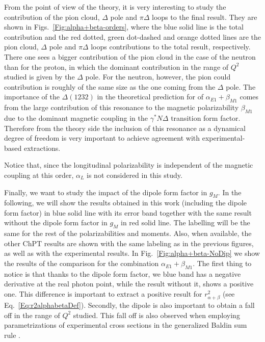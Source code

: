 \documentclass[prc,twocolumn,showpacs,preprintnumbers,amsmath,amssymb
,superscriptaddress,a4paper,nofootinbib
]{revtex4-1}
\begin{document}
From the point of view of the theory, it is very interesting to study the contribution of the pion cloud, $\Delta$ pole and $\pi \Delta$ loops to the final result. 
They are shown in Figs.~\ref{Fig:alpha+beta-orders}, where the blue solid line is the total contribution and the red dotted, green dot-dashed and orange dotted lines are the pion cloud, $\Delta$ pole and $\pi \Delta$ loops contributions to the total result, respectively.
There one sees a bigger contribution of the pion cloud in the case of the neutron than for the proton, in which the dominant contribution in the range of $Q^2$ studied is given by the $\Delta$ pole. 
For the neutron, however, the pion could contribution is roughly of the same size as the one coming from the $\Delta$ pole.
The importance of the $\Delta(1232)$ in the theoretical prediction for of $\alpha_{E1}+\beta_{M1}$ comes from the large contribution of this resonance to the magnetic polarizability $\beta_{M1}$ due to the dominant magnetic coupling in the $\gamma^* N \Delta$ transition form factor. 
Therefore from the theory side the inclusion of this resonance as a dynamical degree of freedom is very important to achieve agreement with experimental-based extractions.




  Notice that, since the longitudinal polarizability is independent of the magnetic coupling at this order, $\alpha_L$ is not considered in this study.

Finally, we want to study the impact of the dipole form factor in $g_M$. 
In the following, we will show the results obtained in this work (including the dipole form factor) in blue solid line with its error band together with the same result without the dipole form factor in $g_M$ in red solid line. 
The labelling will be the same for the rest of the polarizabilities and moments.
  Also, when available, the other ChPT results are shown with the same labeling as in the previous figures, as well as with the experimental results.
In Fig.~\ref{Fig:alpha+beta-NoDip} we show the results of the comparison for the combination $\alpha_{E1}+\beta_{M1}$. 
 The first thing to notice is that thanks to the dipole form factor, we blue band has a negative derivative at the real photon point, while the result without it, shows a positive one. 
 This difference is important to extract a positive result for $r_{\alpha+\beta}^2$ (see Eq.~\ref{Eq:r2alphabetaDef}).
 Secondly, the dipole is also important to obtain a fall off in the range of $Q^2$ studied. 
 This fall off is also observed when employing parametrizations of experimental cross sections in the generalized Baldin sum rule \cite{Hall:2014lea}.
 
\end{document}
